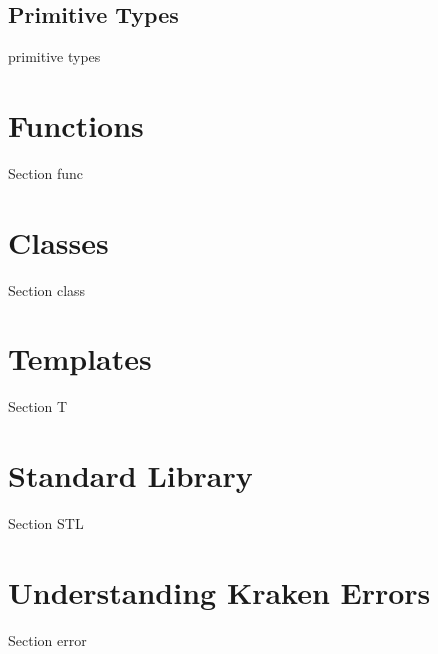 \documentclass{article}
\begin{document}
\subsection{Primitive Types}
  primitive types

\section{Functions}
  Section func


\section{Classes}
  Section class

\section{Templates}
  Section T

\section{Standard Library}
  Section STL

\section{Understanding Kraken Errors}
  Section error
\end{document}
